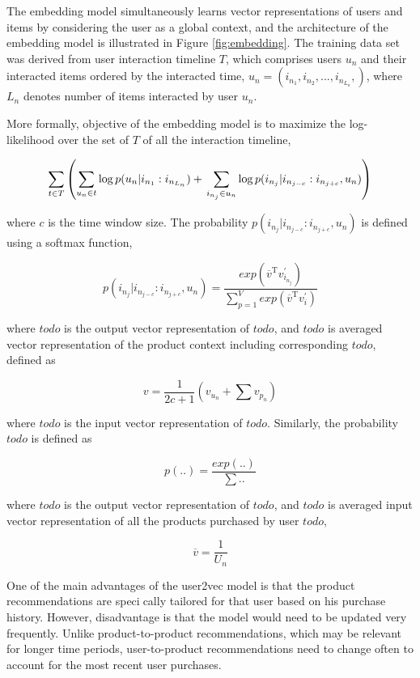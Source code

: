 \documentclass{sig-alternate-05-2015}
\begin{document}
The embedding model simultaneously learns vector representations of users and items
by considering the user as a global context,
and the architecture of the embedding model is illustrated in Figure \ref{fig:embedding}.
The training data set was derived from user interaction timeline $T$,
which comprises users $u_n$ and their interacted items
ordered by the interacted time,
$u_n = (i_{n_1}, i_{n_2}, ..., i_{n_{L_n}},)$,
where $L_n$ denotes number of items interacted by user $u_n$.

More formally, objective of the embedding model is to
maximize the log-likelihood over the set of $T$ of all the interaction timeline,

$$
	\sum_{t \in T}
	\left(
		\sum_{u_n \in t}
		{
			\log p ( u_n | i_{n_1}:i_{n_{L_n}} )
		} + \\
		\sum_{i_{n_j} \in u_n}
		{
			\log p ( i_{n_j} | i_{n_{j-c}} : i_{n_{j+c}}, u_n )
		}
	\right)
$$

where $c$ is the time window size.
The probability $p ( i_{n_j} | i_{n_{j-c}} : i_{n_{j+c}}, u_n )$ is defined using a softmax function,

$$
	p ( i_{n_j} | i_{n_{j-c}} : i_{n_{j+c}}, u_n ) =
	\frac
	{
		exp( \overline{v} ^ \mathrm{ T } v_{ i_{n_j} }^{'} )
	}
	{
		\sum_{p=1}^{V} exp( \overline{v} ^ \mathrm{ T } v_{ i }^{'} )
	}
$$

where $todo$ is the output vector representation of $todo$,
and $todo$ is averaged vector representation of the product context
including corresponding $todo$, defined as

$$
	v = \frac{1}{2c+1} (v_{u_n} + \sum{v_{p_n}})
$$

where $todo$ is the input vector representation of $todo$.
Similarly, the probability $todo$ is defined as

$$
	p(..) = \frac{exp(..)}{\sum{..}}
$$

where $todo$ is the output vector representation of $todo$,
and $todo$ is averaged input vector representation of all the products
purchased by user $todo$,

$$
	\overline{v} = \frac{1}{U_n}
$$

One of the main advantages of the user2vec model is that
the product recommendations are specically tailored for
that user based on his purchase history. However, disadvantage
is that the model would need to be updated very frequently.
Unlike product-to-product recommendations, which
may be relevant for longer time periods, user-to-product recommendations
need to change often to account for the most
recent user purchases.
\end{document}

